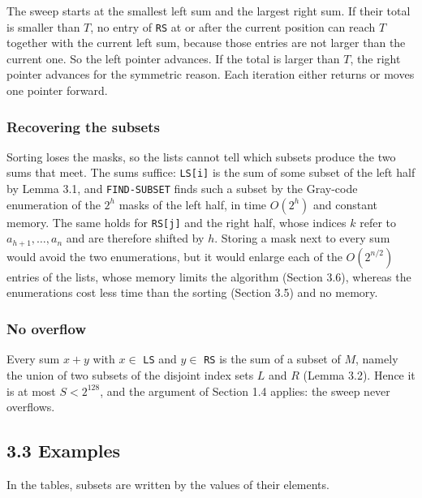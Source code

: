 \documentclass[
]{article}
\begin{document}
The sweep starts at the smallest left sum and the largest right sum. If
their total is smaller than \(T\), no entry of \texttt{RS} at or after
the current position can reach \(T\) together with the current left sum,
because those entries are not larger than the current one. So the left
pointer advances. If the total is larger than \(T\), the right pointer
advances for the symmetric reason. Each iteration either returns or
moves one pointer forward.

\hypertarget{recovering-the-subsets}{%
\subsubsection{Recovering the subsets}\label{recovering-the-subsets}}

Sorting loses the masks, so the lists cannot tell which subsets produce
the two sums that meet. The sums suffice: \texttt{LS{[}i{]}} is the sum
of some subset of the left half by Lemma 3.1, and \texttt{FIND-SUBSET}
finds such a subset by the Gray-code enumeration of the \(2^h\) masks of
the left half, in time \(O(2^h)\) and constant memory. The same holds
for \texttt{RS{[}j{]}} and the right half, whose indices \(k\) refer to
\(a_{h+1}, \dots, a_n\) and are therefore shifted by \(h\). Storing a
mask next to every sum would avoid the two enumerations, but it would
enlarge each of the \(O(2^{n/2})\) entries of the lists, whose memory
limits the algorithm (Section 3.6), whereas the enumerations cost less
time than the sorting (Section 3.5) and no memory.

\hypertarget{no-overflow-1}{%
\subsubsection{No overflow}\label{no-overflow-1}}

Every sum \(x + y\) with \(x \in\) \texttt{LS} and \(y \in\) \texttt{RS}
is the sum of a subset of \(M\), namely the union of two subsets of the
disjoint index sets \(L\) and \(R\) (Lemma 3.2). Hence it is at most
\(S < 2^{128}\), and the argument of Section 1.4 applies: the sweep
never overflows.

\hypertarget{examples-1}{%
\subsection{3.3 Examples}\label{examples-1}}

In the tables, subsets are written by the values of their elements.
\end{document}
